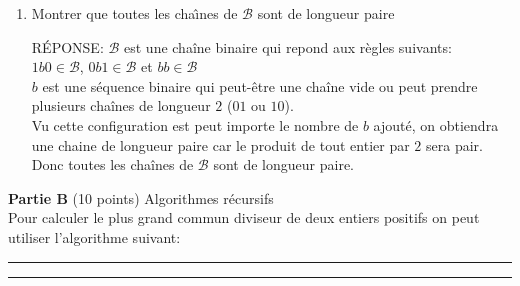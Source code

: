 \begin{enumerate}[\bf 1)]
\begin{framed}
\end{framed}
\item{} Montrer que toutes les cha{\^\i}nes  de $\mathcal{B}$ sont de longueur paire
\begin{framed}

RÉPONSE:
$\mathcal{B}$ est une chaîne binaire qui repond aux règles suivants:\\ 
$1b0 \in \mathcal{B} $, $0b1 \in \mathcal{B} $ et $bb \in \mathcal{B} $\\
$b$ est une séquence binaire qui peut-être une chaîne vide ou peut prendre plusieurs chaînes de longueur $2$ ($01$ ou $10$).\\
Vu cette configuration est peut importe le nombre de $b$ ajouté, on obtiendra une chaine de longueur paire car le produit de tout entier par $2$ sera pair. \\
Donc toutes les chaînes de $\mathcal{B}$ sont de longueur paire.

\end{framed}
\end{enumerate}

\newpage
\textbf{Partie B} (10 points) Algorithmes r\'ecursifs\\

Pour calculer le plus grand commun diviseur de deux entiers positifs on peut utiliser
l'algorithme suivant:\\
\rule{0.8\textwidth}{0.4mm}
            \begin{algorithmic}[1]
                    \State {}
                \Else 
                    \State {}
                 \EndIf
                \EndFunction
            \end{algorithmic}
\rule{0.8\textwidth}{0.4mm}


